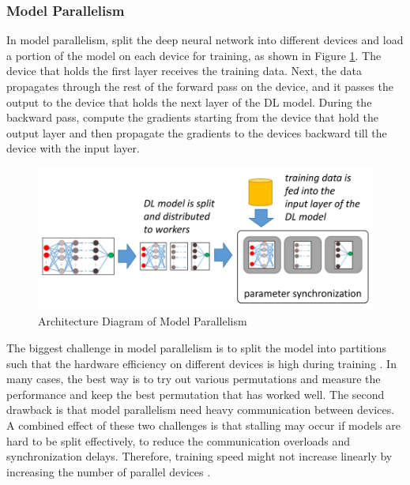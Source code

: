 \subsubsection{Model Parallelism}
In model parallelism, split the deep neural network into different devices and load a portion of the model on each device for training, as shown in Figure \ref{fig:modelparallel}. The device that holds the first layer receives the training data. Next, the data propagates through the rest of the forward pass on the device, and it passes the output to the device that holds the next layer of the DL model. During the backward pass, compute the gradients starting from the device that hold the output layer and then propagate the gradients to the devices backward till the device with the input layer. 

\begin{figure}[ht]
  \begin{center}
    \includegraphics[width=\textwidth]{images/model parallelism.png} 
    \caption{Architecture Diagram of Model Parallelism  \cite{Mayer2020ScalableInfrastructures}}
    \label{fig:modelparallel}
  \end{center}
\end{figure}

The biggest challenge in model parallelism is to split the model into partitions such that the hardware efficiency on different devices is high during training \cite{Mayer2017ThePath}. In many cases, the best way is to try out various permutations and measure the performance and keep the best permutation that has worked well. The second drawback is that model parallelism need heavy communication between devices. A combined effect of these two challenges is that stalling may occur if models are hard to be split effectively, to reduce the communication overloads and synchronization delays. Therefore, training speed might not increase linearly by increasing the number of parallel devices \cite{Mirhoseini2017DeviceLearning}.

